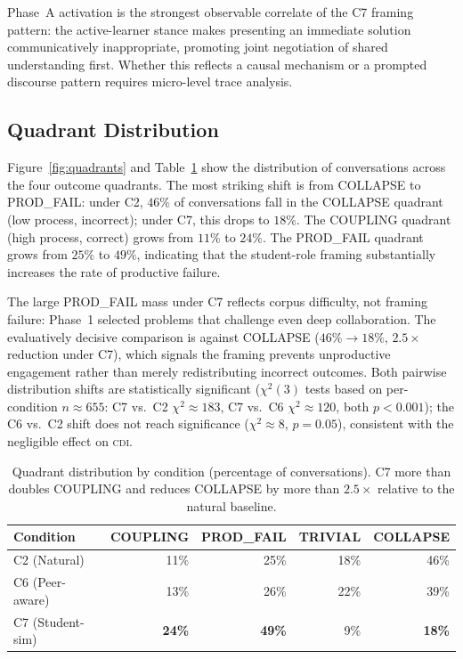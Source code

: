 \documentclass{article}
\newcommand{\CDI}{\textsc{cdi}}
\begin{document}
Phase~A activation is the strongest observable correlate of the C7
framing pattern: the active-learner stance makes presenting an
immediate solution communicatively inappropriate, promoting joint
negotiation of shared understanding first. Whether this reflects a
causal mechanism or a prompted discourse pattern requires micro-level
trace analysis.

\subsection{Quadrant Distribution}

Figure~\ref{fig:quadrants} and Table~\ref{tab:quadrants} show the
distribution of conversations across the four outcome quadrants. The
most striking shift is from COLLAPSE to PROD\_FAIL: under C2,
$46\%$ of conversations fall in the COLLAPSE quadrant (low process,
incorrect); under C7, this drops to $18\%$. The COUPLING quadrant
(high process, correct) grows from $11\%$ to $24\%$. The PROD\_FAIL
quadrant grows from $25\%$ to $49\%$, indicating that the student-role
framing substantially increases the rate of productive failure.

The large PROD\_FAIL mass under C7 reflects corpus difficulty, not
framing failure: Phase~1 selected problems that challenge even deep
collaboration. The evaluatively decisive comparison is against COLLAPSE
($46\% \to 18\%$, $2.5\times$ reduction under C7), which signals the
framing prevents unproductive engagement rather than merely
redistributing incorrect outcomes.
Both pairwise distribution shifts are statistically significant
($\chi^2(3)$ tests based on per-condition $n\approx 655$:
C7 vs.\ C2 $\chi^2 \approx 183$, C7 vs.\ C6 $\chi^2 \approx 120$,
both $p < 0.001$); the C6 vs.\ C2 shift does not reach significance
($\chi^2 \approx 8$, $p = 0.05$), consistent with the negligible
effect on \CDI{}.

\begin{table}[t]
  \caption{Quadrant distribution by condition (percentage of
  conversations). C7 more than doubles COUPLING and reduces COLLAPSE
  by more than $2.5\times$ relative to the natural baseline.}
  \label{tab:quadrants}
  \centering
  \begin{tabular}{lrrrr}
    \toprule
    \textbf{Condition} & \textbf{COUPLING} & \textbf{PROD\_FAIL} & \textbf{TRIVIAL} & \textbf{COLLAPSE} \\
    \midrule
    C2 (Natural)   & 11\% & 25\% & 18\% & 46\% \\
    C6 (Peer-aware) & 13\% & 26\% & 22\% & 39\% \\
    C7 (Student-sim) & \textbf{24\%} & \textbf{49\%} &  9\% & \textbf{18\%} \\
    \bottomrule
  \end{tabular}
\end{table}
\end{document}
